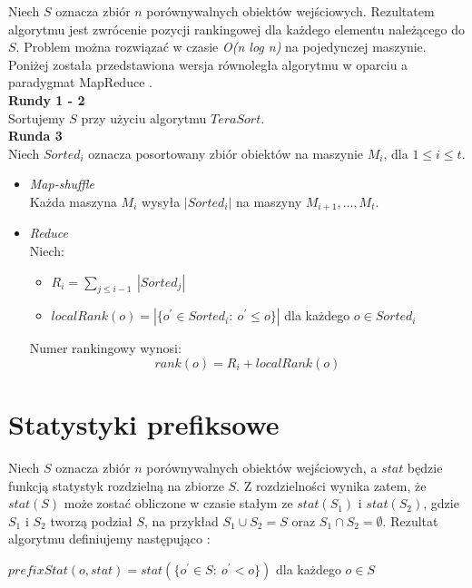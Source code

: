 \documentclass{pracamgr}
\begin{document}
Niech \(S\) oznacza zbiór \(n\) porównywalnych obiektów wejściowych. Rezultatem algorytmu jest zwrócenie pozycji rankingowej dla każdego elementu należącego do \(S\). Problem można rozwiązać w czasie \textit{O(n log n)} na pojedynczej maszynie. Poniżej została przedstawiona wersja równoległa algorytmu w oparciu a paradygmat MapReduce \cite{tao2013minimal}. \\

\textbf{Rundy 1 - 2} \\
Sortujemy \(S\) przy użyciu algorytmu \(TeraSort\). \\

\textbf{Runda 3} \\
Niech \(Sorted_i\) oznacza posortowany zbiór obiektów na maszynie \(M_i\), dla \(1 \leq i \leq t\).
\begin{itemize}
    \item \textit{Map-shuffle} \\
    Każda maszyna \(M_i\) wysyła \(|Sorted_i|\) na maszyny \(M_{i+1}, ..., M_t\).
    \item \textit{Reduce} \\
    Niech:
    \begin{itemize}
        \item $R_i = \sum_{j \leq i-1} \ |Sorted_j|$
        \item \(localRank(o) = |\{o^\prime \in Sorted_i : \ o^\prime \leq o\}|\) dla każdego \(o \in Sorted_i\)
    \end{itemize}
    Numer rankingowy wynosi: \\
    
    $$rank(o) = R_i + localRank(o)$$
    
\end{itemize}

\section{Statystyki prefiksowe}
Niech \(S\) oznacza zbiór \(n\) porównywalnych obiektów wejściowych, a \(stat\) będzie funkcją statystyk rozdzielną na zbiorze \(S\). Z rozdzielności wynika zatem, że \(stat(S)\) może zostać obliczone w czasie stałym ze \(stat(S_1)\) i \(stat(S_2)\), gdzie \(S_1\) i \(S_2\) tworzą podział \(S\), na przykład \(S_1 \cup S_2 = S\) oraz \(S_1 \cap S_2 = \emptyset\). Rezultat algorytmu definiujemy następująco \cite{tao2013minimal}:
\begin{center}
\(prefixStat(o, stat) = stat(\{o^\prime \in S: \ o^\prime < o\})\) dla każdego \(o \in S\) \\
\end{center}
\end{document}
